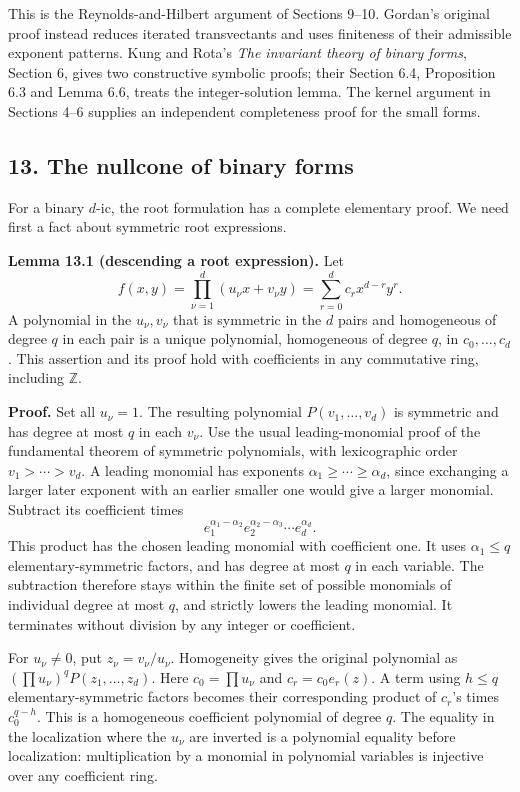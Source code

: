 \documentclass[
]{article}
\begin{document}
This is the Reynolds-and-Hilbert argument of Sections 9--10. Gordan's
original proof instead reduces iterated transvectants and uses
finiteness of their admissible exponent patterns. Kung and Rota's
\emph{The invariant theory of binary forms}, Section 6, gives two
constructive symbolic proofs; their Section 6.4, Proposition 6.3 and
Lemma 6.6, treats the integer-solution lemma. The kernel argument in
Sections 4--6 supplies an independent completeness proof for the small
forms.

\subsection{13. The nullcone of binary forms}\label{section-13}

For a binary \(d\)-ic, the root formulation has a complete elementary
proof. We need first a fact about symmetric root expressions.

\protect{}\label{lemma-13-1}{}

\textbf{Lemma 13.1 (descending a root expression).} Let \[
f(x,y)=\prod_{\nu=1}^d(u_\nu x+v_\nu y)
=\sum_{r=0}^d c_rx^{d-r}y^r.
\] A polynomial in the \(u_\nu,v_\nu\) that is symmetric in the \(d\)
pairs and homogeneous of degree \(q\) in each pair is a unique
polynomial, homogeneous of degree \(q\), in \(c_0,\ldots,c_d\). This
assertion and its proof hold with coefficients in any commutative ring,
including \(\mathbb Z\).

\textbf{Proof.} Set all \(u_\nu=1\). The resulting polynomial
\(P(v_1,\ldots,v_d)\) is symmetric and has degree at most \(q\) in each
\(v_\nu\). Use the usual leading-monomial proof of the fundamental
theorem of symmetric polynomials, with lexicographic order
\(v_1>\cdots>v_d\). A leading monomial has exponents
\(\alpha_1\geq\cdots\geq\alpha_d\), since exchanging a larger later
exponent with an earlier smaller one would give a larger monomial.
Subtract its coefficient times \[
e_1^{\alpha_1-\alpha_2}e_2^{\alpha_2-\alpha_3}
\cdots e_d^{\alpha_d}.
\] This product has the chosen leading monomial with coefficient one. It
uses \(\alpha_1\leq q\) elementary-symmetric factors, and has degree at
most \(q\) in each variable. The subtraction therefore stays within the
finite set of possible monomials of individual degree at most \(q\), and
strictly lowers the leading monomial. It terminates without division by
any integer or coefficient.

For \(u_\nu\ne0\), put \(z_\nu=v_\nu/u_\nu\). Homogeneity gives the
original polynomial as \((\prod u_\nu)^qP(z_1,\ldots,z_d)\). Here
\(c_0=\prod u_\nu\) and \(c_r=c_0e_r(z)\). A term using \(h\leq q\)
elementary-symmetric factors becomes their corresponding product of
\(c_r\)'s times \(c_0^{q-h}\). This is a homogeneous coefficient
polynomial of degree \(q\). The equality in the localization where the
\(u_\nu\) are inverted is a polynomial equality before localization:
multiplication by a monomial in polynomial variables is injective over
any coefficient ring.
\end{document}
